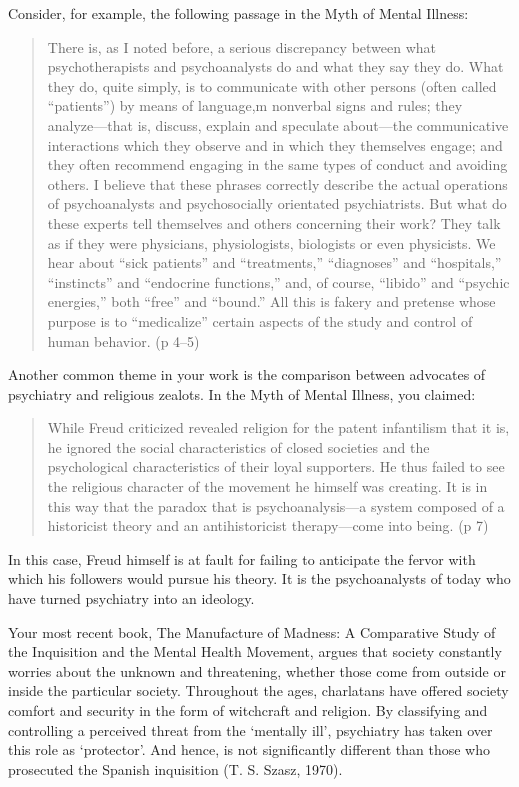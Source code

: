 \begin{refsection}
Consider, for example, the following passage in the Myth of Mental Illness:

\begin{quote}

There is, as I noted before, a serious discrepancy between what psychotherapists and psychoanalysts do and what they say they do. What they do, quite simply, is to communicate with other persons (often called ``patients'') by means of language,m nonverbal signs and rules; they analyze---that is, discuss, explain and speculate about---the communicative interactions which they observe and in which they themselves engage; and they often recommend engaging in the same types of conduct and avoiding others. I believe that these phrases correctly describe the actual operations of psychoanalysts and psychosocially orientated psychiatrists. But what do these experts tell themselves and others concerning their work? They talk as if they were physicians, physiologists, biologists or even physicists. We hear about ``sick patients'' and ``treatments,'' ``diagnoses'' and ``hospitals,'' ``instincts'' and ``endocrine functions,'' and, of course, ``libido'' and ``psychic energies,'' both ``free'' and ``bound.'' All this is fakery and pretense whose purpose is to ``medicalize'' certain aspects of the study and control of human behavior. (p 4--5)
\end{quote}

Another common theme in your work is the comparison between advocates of psychiatry and religious zealots. In the Myth of Mental Illness, you claimed:

\begin{quote}

While Freud criticized revealed religion for the patent infantilism that it is, he ignored the social characteristics of closed societies and the psychological characteristics of their loyal supporters. He thus failed to see the religious character of the movement he himself was creating. It is in this way that the paradox that is psychoanalysis---a system composed of a historicist theory and an antihistoricist therapy---come into being. (p 7)
\end{quote}

In this case, Freud himself is at fault for failing to anticipate the fervor with which his followers would pursue his theory. It is the psychoanalysts of today who have turned psychiatry into an ideology.

Your most recent book, The Manufacture of Madness: A Comparative Study of the Inquisition and the Mental Health Movement, argues that society constantly worries about the unknown and threatening, whether those come from outside or inside the particular society. Throughout the ages, charlatans have offered society comfort and security in the form of witchcraft and religion. By classifying and controlling a perceived threat from the `mentally ill', psychiatry has taken over this role as `protector'. And hence, is not significantly different than those who prosecuted the Spanish inquisition (T. S. Szasz, 1970).


\end{refsection}
